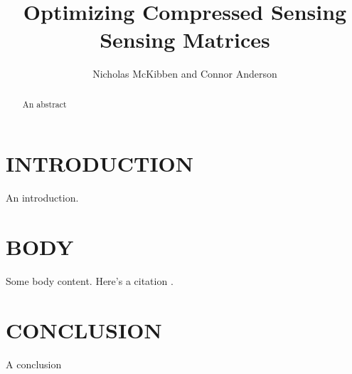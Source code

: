 \documentclass[journal]{IEEEtran}
\title{Optimizing Compressed Sensing Sensing Matrices}
\author{Nicholas McKibben and Connor Anderson}
\begin{document}
\maketitle
\thispagestyle{empty}
\pagestyle{empty}
\begin{abstract}

An abstract

\end{abstract}
\section{INTRODUCTION}

An introduction.

\section{BODY}

Some body content. Here's a citation \cite{example}.

\section{CONCLUSION}

A conclusion



{}
\end{document}
